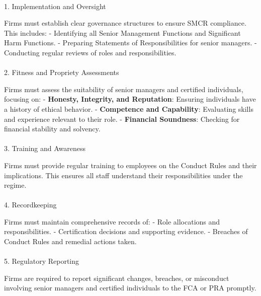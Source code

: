 \documentclass[
  a4paper,
]{article}
\makeatletter
\let\oldparagraph\paragraph
\renewcommand{\paragraph}{
    \@ifstar
      \xxxParagraphStar
      \xxxParagraphNoStar
  }
\newcommand{\xxxParagraphStar}[1]{\oldparagraph*{#1}\mbox{}}
\newcommand{\xxxParagraphNoStar}[1]{\oldparagraph{#1}\mbox{}}
\makeatother
\begin{document}
\paragraph{1. Implementation and
Oversight}\label{implementation-and-oversight}

Firms must establish clear governance structures to ensure SMCR
compliance. This includes: - Identifying all Senior Management Functions
and Significant Harm Functions. - Preparing Statements of
Responsibilities for senior managers. - Conducting regular reviews of
roles and responsibilities.

\paragraph{2. Fitness and Propriety
Assessments}\label{fitness-and-propriety-assessments}

Firms must assess the suitability of senior managers and certified
individuals, focusing on: - \textbf{Honesty, Integrity, and Reputation}:
Ensuring individuals have a history of ethical behavior. -
\textbf{Competence and Capability}: Evaluating skills and experience
relevant to their role. - \textbf{Financial Soundness}: Checking for
financial stability and solvency.

\paragraph{3. Training and Awareness}\label{training-and-awareness}

Firms must provide regular training to employees on the Conduct Rules
and their implications. This ensures all staff understand their
responsibilities under the regime.

\paragraph{4. Recordkeeping}\label{recordkeeping}

Firms must maintain comprehensive records of: - Role allocations and
responsibilities. - Certification decisions and supporting evidence. -
Breaches of Conduct Rules and remedial actions taken.

\paragraph{5. Regulatory Reporting}\label{regulatory-reporting}

Firms are required to report significant changes, breaches, or
misconduct involving senior managers and certified individuals to the
FCA or PRA promptly.
\end{document}
